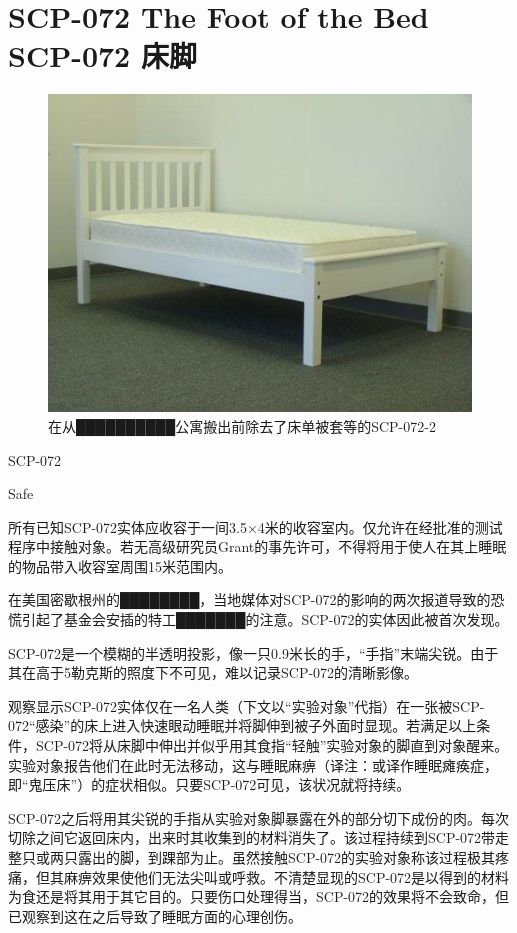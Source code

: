 \chapter[SCP-072 床脚]{
    SCP-072 The Foot of the Bed\\
    SCP-072 床脚
}

\label{chap:SCP-072}

\begin{figure}[H]
    \centering
    \includegraphics[width=0.5\linewidth]{images/SCP-072.jpg}
    \caption*{在从██████████公寓搬出前除去了床单被套等的SCP-072-2}
\end{figure}

SCP-072

Safe

所有已知SCP-072实体应收容于一间3.5×4米的收容室内。仅允许在经批准的测试程序中接触对象。若无高级研究员Grant的事先许可，不得将用于使人在其上睡眠的物品带入收容室周围15米范围内。

在美国密歇根州的████████，当地媒体对SCP-072的影响的两次报道导致的恐慌引起了基金会安插的特工███████的注意。SCP-072的实体因此被首次发现。

SCP-072是一个模糊的半透明投影，像一只0.9米长的手，“手指”末端尖锐。由于其在高于5勒克斯的照度下不可见，难以记录SCP-072的清晰影像。

观察显示SCP-072实体仅在一名人类（下文以“实验对象”代指）在一张被SCP-072“感染”的床上进入快速眼动睡眠并将脚伸到被子外面时显现。若满足以上条件，SCP-072将从床脚中伸出并似乎用其食指“轻触”实验对象的脚直到对象醒来。实验对象报告他们在此时无法移动，这与睡眠麻痹（译注：或译作睡眠瘫痪症，即“鬼压床”）的症状相似。只要SCP-072可见，该状况就将持续。

SCP-072之后将用其尖锐的手指从实验对象脚暴露在外的部分切下成份的肉。每次切除之间它返回床内，出来时其收集到的材料消失了。该过程持续到SCP-072带走整只或两只露出的脚，到踝部为止。虽然接触SCP-072的实验对象称该过程极其疼痛，但其麻痹效果使他们无法尖叫或呼救。不清楚显现的SCP-072是以得到的材料为食还是将其用于其它目的。只要伤口处理得当，SCP-072的效果将不会致命，但已观察到这在之后导致了睡眠方面的心理创伤。

